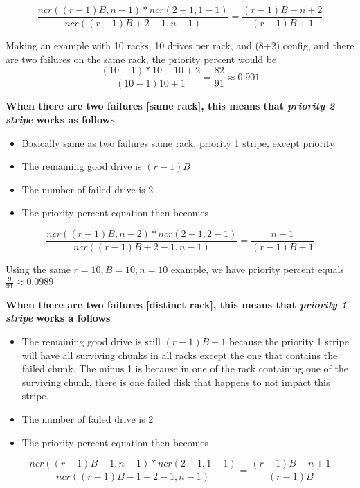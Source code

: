 \documentclass[journal]{IEEEtran}
\begin{document}
\begin{equation*}
  \frac{ncr((r-1)B, n-1)*ncr(2-1, 1-1)}{ncr((r-1)B+2-1, n-1)}=\frac{(r-1)B-n+2}{(r-1)B+1}
\end{equation*}

Making an example with 10 racks, 10 drives per rack, and (8+2) config, and there are two failures on the same rack, the priority percent would be
\begin{equation*}
  \frac{(10-1)*10-10+2}{(10-1)10+1}=\frac{82}{91}\approx 0.901
\end{equation*}

\textbf{When there are two failures [same rack], this means that \textit{priority 2 stripe} works as follows}
\begin{itemize}
  \item Basically same as two failures same rack, priority 1 stripe, except priority
  \item The remaining good drive is $(r-1)B$
  \item The number of failed drive is 2
  \item The priority percent equation then becomes
\end{itemize}

\begin{equation*}
  \frac{ncr((r-1)B, n-2)*ncr(2-1, 2-1)}{ncr((r-1)B+2-1, n-1)}=\frac{n-1}{(r-1)B+1}
\end{equation*}

Using the same $r=10, B=10, n=10$ example, we have priority percent equals $\frac{9}{91}\approx 0.0989$


\textbf{When there are two failures [distinct rack], this means that \textit{priority 1 stripe} works a follows}
\begin{itemize}
  \item The remaining good drive is still $(r-1)B-1$ because the priority 1 stripe will have all surviving chunks in all racks except the one that contains the failed chunk. The minus 1 is because in one of the rack containing one of the surviving chunk, there is one failed disk that happens to not impact this stripe.
  \item The number of failed drive is 2
  \item The priority percent equation then becomes
\end{itemize}

\begin{equation*}
  \frac{ncr((r-1)B-1, n-1)*ncr(2-1, 1-1)}{ncr((r-1)B-1+2-1, n-1)}=\frac{(r-1)B-n+1}{(r-1)B}
\end{equation*}
\end{document}
